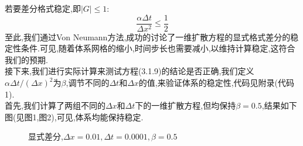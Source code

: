 \documentclass{article}
\numberwithin{equation}{subsection}
\begin{document}
若要差分格式稳定,即$|G|\leq 1$:
\begin{equation}
    \frac{\alpha \Delta t}{\Delta x^{2}} \leq \frac{1}{2}
\end{equation}
至此,我们通过Von Neumann方法,成功的讨论了一维扩散方程的显式格式差分的稳定性条件.可见,随着体系网格的缩小,时间步长也需要减小,以维持计算稳定,这符合我们的预期.\\
接下来,我们进行实际计算来测试方程(3.1.9)的结论是否正确,我们定义$\alpha\Delta t/(\Delta x)^2$为$\beta$,调节不同的$\Delta t$和$\Delta x$的值,来验证体系的稳定性,代码见附录(代码1).\\
首先,我们计算了两组不同的$\Delta x$和$\Delta t$下的一维扩散方程,但均保持$\beta = 0.5$,结果如下图(见图1,图2),可见,体系均能保持稳定.\\

\begin{figure}[H]
\centering
{}
\quad
{}
\quad
{}
\quad
{}
\caption{显式差分,$\Delta x = 0.01,\Delta t = 0.0001,\beta = 0.5$}
\end{figure}
\end{document}
